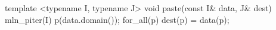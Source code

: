 template <typename I, typename J>
void paste(const I& data, J& dest)
{
  mln_piter(I) p(data.domain());
  for_all(p)
  dest(p) = data(p);
}
